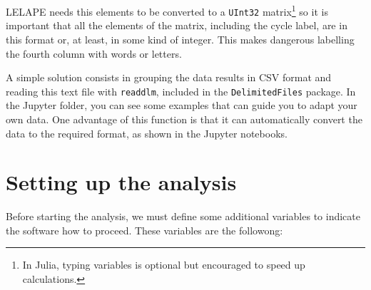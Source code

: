 LELAPE needs this elements to be converted to a \texttt{UInt32} matrix\footnote{In Julia, typing variables is optional but encouraged to speed up calculations.} so it is important that all the elements of the matrix, including the cycle label, are in this format or, at least, in some kind of integer. This makes dangerous labelling the fourth column with words or letters. 

A simple solution consists in grouping the data results in CSV format and reading this text file with \texttt{readdlm}, included in the \texttt{DelimitedFiles} package. In the Jupyter folder, you can see some examples that can guide you to adapt your own data. One advantage of this function is that it can automatically convert the data to the required format, as shown in the Jupyter notebooks.

\section{Setting up the analysis}
%
Before starting the analysis, we must define some additional variables to indicate the software how to proceed. These variables are the followong:
%
